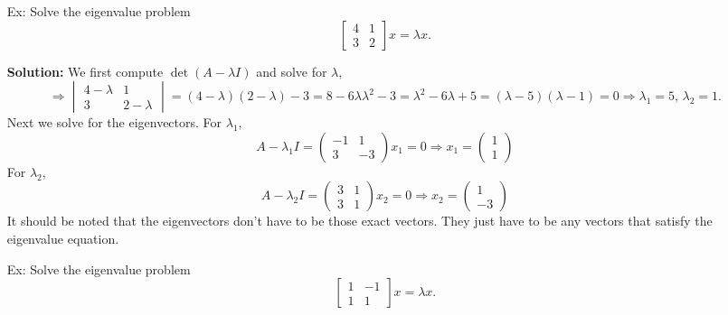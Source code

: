\documentclass[reqno]{amsart}
\theoremstyle{definition}
\begin{document}
\begin{enumerate}

\setlength{\itemsep}{2em}

\item[Ex:  ]  Solve the eigenvalue problem
%
\begin{equation*}
\begin{bmatrix}
4 & 1\\
3 & 2
\end{bmatrix}x = \lambda x.
\end{equation*}
%

\textbf{Solution:  }  We first compute $\det(A-\lambda I)$ and solve for $\lambda$,
%
\begin{equation*}
\Rightarrow \begin{vmatrix}
4-\lambda & 1\\
3 & 2-\lambda
\end{vmatrix} = (4-\lambda)(2-\lambda) - 3 = 8 - 6\lambda \lambda^2 - 3 = \lambda^2 - 6\lambda + 5 = (\lambda - 5)(\lambda - 1) = 0 \Rightarrow \lambda_1 = 5,\, \lambda_2 = 1.
\end{equation*}
%
Next we solve for the eigenvectors.  For $\lambda_1$,
%
\begin{equation*}
A - \lambda_1I = \begin{pmatrix}
-1 & 1\\
3 & -3
\end{pmatrix}x_1 = 0 \Rightarrow x_1 = \begin{pmatrix}
1\\
1
\end{pmatrix}
\end{equation*}
%
For $\lambda_2$,
%
\begin{equation*}
A - \lambda_2I = \begin{pmatrix}
3 & 1\\
3 & 1
\end{pmatrix}x_2 = 0 \Rightarrow x_2 = \begin{pmatrix}
1\\
-3
\end{pmatrix}
\end{equation*}
%
It should be noted that the eigenvectors don't have to be those exact vectors.  They just have to be any vectors that satisfy the eigenvalue equation.

\item[Ex:  ]  Solve the eigenvalue problem
%
\begin{equation*}
\begin{bmatrix}
1 & -1\\
1 & 1
\end{bmatrix}x = \lambda x.
\end{equation*}
%


\end{enumerate}
\end{document}
